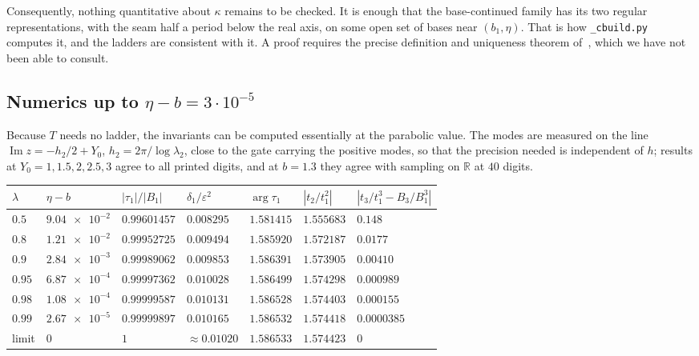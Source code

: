 \documentclass[11pt,a4paper]{article}
\theoremstyle{definition}
\begin{document}
\noindent
Consequently, nothing quantitative about $\kappa$ remains to be checked.  It
is enough that the base-continued family has its two regular representations,
with the seam half a period below the real axis, on some open set of bases
near $(b_1,\eta)$.  That is how \texttt{\_cbuild.py} computes it, and the
ladders are consistent with it.  A proof requires the precise definition and
uniqueness theorem of~\cite{Paulsen2019}, which we have not been able to
consult.

\subsection{Numerics up to $\eta-b=3\cdot10^{-5}$}

Because $T$ needs no ladder, the invariants can be computed essentially at
the parabolic value.  The modes are measured on the line
$\operatorname{Im}z=-h_2/2+Y_0$, $h_2=2\pi/\log\lambda_2$, close to the gate
carrying the positive modes, so that the precision needed is independent of
$h$; results at $Y_0=1,1.5,2,2.5,3$ agree to all printed digits, and at
$b=1.3$ they agree with sampling on $\mathbb R$ at $40$ digits.

\begin{center}
\small\setlength{\tabcolsep}{4pt}
\begin{tabular}{lllllll}
\toprule
$\lambda$ & $\eta-b$ & $|\tau_1|/|B_1|$ & $\delta_1/\varepsilon^2$ & $\arg\tau_1$ & $|t_2/t_1^2|$ & $|t_3/t_1^3-B_3/B_1^3|$\\
\midrule
$0.5$ & $\num{9.04e-2}$ & $0.99601457$ & $0.008295$ & $1.581415$ & $1.555683$ & $0.148$\\
$0.8$ & $\num{1.21e-2}$ & $0.99952725$ & $0.009494$ & $1.585920$ & $1.572187$ & $0.0177$\\
$0.9$ & $\num{2.84e-3}$ & $0.99989062$ & $0.009853$ & $1.586391$ & $1.573905$ & $0.00410$\\
$0.95$ & $\num{6.87e-4}$ & $0.99997362$ & $0.010028$ & $1.586499$ & $1.574298$ & $0.000989$\\
$0.98$ & $\num{1.08e-4}$ & $0.99999587$ & $0.010131$ & $1.586528$ & $1.574403$ & $0.000155$\\
$0.99$ & $\num{2.67e-5}$ & $0.99999897$ & $0.010165$ & $1.586532$ & $1.574418$ & $0.0000385$\\
\midrule
limit & $0$ & $1$ & $\approx0.01020$ & $1.586533$ & $1.574423$ & $0$\\
\bottomrule
\end{tabular}
\end{center}
\end{document}
